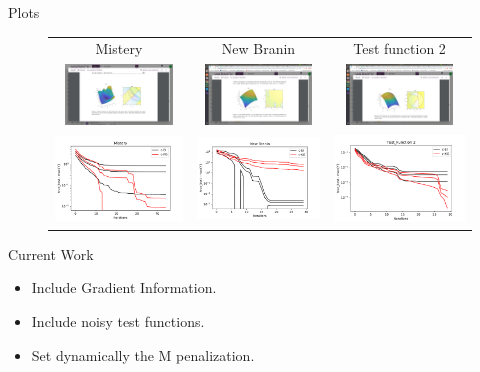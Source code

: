 \documentclass{beamer}
\begin{document}
\begin{frame}{Plots}
\begin{figure}
	
	\centering
	\begin{tabular}{ccc}
		Mistery&
		New Branin&
		Test function 2\\
		
		\includegraphics[height=1.6cm, trim={450 300 450 300},clip]{Mistery.png}&
		\includegraphics[height=1.6cm, trim={450 240 450 360},clip]{New_Branin.png}&
		\includegraphics[height=1.6cm, trim={450 230 450 370},clip]{test_function_2.png}\\
		\includegraphics[width=0.32\linewidth]{mistery_OC.pdf}&
		\includegraphics[width=0.32\linewidth]{New_Branin_OC.pdf}&
		\includegraphics[width=0.32\linewidth]{test_function_2_OC.pdf}\\
	\end{tabular}	
\end{figure}
\end{frame}

\begin{frame}{Current Work}
\begin{itemize}
	\item Include Gradient Information.
	\item Include noisy test functions.
	\item Set dynamically the M penalization.
\end{itemize}
\end{frame}
\end{document}
